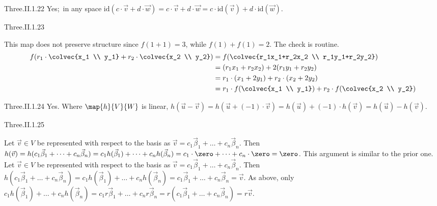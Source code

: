 \begin{ans}{Three.II.1.22}
      Yes;~in any space \( \text{id}(c\cdot \vec{v}+d\cdot \vec{w})
      = c\cdot \vec{v}+d\cdot \vec{w}
      = c\cdot\text{id}(\vec{v})+d\cdot\text{id}(\vec{w}) \).
    
\end{ans}
\begin{ans}{Three.II.1.23}
      \begin{exparts}
         \partsitem This map does not preserve structure since
           \( f(1+1)=3 \), while \( f(1)+f(1)=2 \).
         \partsitem The check is routine.
           \begin{align*}
             f(r_1\cdot\colvec{x_1 \\ y_1}+r_2\cdot\colvec{x_2 \\ y_2})
             &=f(\colvec{r_1x_1+r_2x_2 \\ r_1y_1+r_2y_2})               \\
             &=(r_1x_1+r_2x_2)+2(r_1y_1+r_2y_2)                          \\
             &=r_1\cdot (x_1+2y_1)+r_2\cdot (x_2+2y_2)                   \\
             &=r_1\cdot f(\colvec{x_1 \\ y_1})+r_2\cdot f(\colvec{x_2 \\ y_2})
           \end{align*}
      \end{exparts}
     
\end{ans}
\begin{ans}{Three.II.1.24}
      Yes.
      Where \( \map{h}{V}{W} \) is linear,
      \( h(\vec{u}-\vec{v})
         =h(\vec{u}+(-1)\cdot\vec{v})
         =h(\vec{u})+(-1)\cdot h(\vec{v})
         =h(\vec{u})-h(\vec{v}) \).
    
\end{ans}
\begin{ans}{Three.II.1.25}
      \begin{exparts}
       \partsitem Let \( \vec{v}\in V \) be represented with respect to the
         basis as \( \vec{v}=c_1\vec{\beta}_1+\dots+c_n\vec{\beta}_n \).
         Then \( h(\vec{v})=h(c_1\vec{\beta}_1+\dots+c_n\vec{\beta}_n)
                  =c_1h(\vec{\beta}_1)+\dots+c_nh(\vec{\beta}_n)
                  =c_1\cdot\zero+\dots+c_n\cdot\zero
                  =\zero \).
       \partsitem This argument is similar to the prior one.
         Let \( \vec{v}\in V \) be represented with respect to the
         basis as \( \vec{v}=c_1\vec{\beta}_1+\dots+c_n\vec{\beta}_n \).
         Then \( h(c_1\vec{\beta}_1+\dots+c_n\vec{\beta}_n)
            =c_1h(\vec{\beta}_1)+\dots+c_nh(\vec{\beta}_n)
            =c_1\vec{\beta}_1+\dots+c_n\vec{\beta}_n
            =\vec{v} \).
       \partsitem As above, only
         \( c_1h(\vec{\beta}_1)+\dots+c_nh(\vec{\beta}_n)
            =c_1r\vec{\beta}_1+\dots+c_nr\vec{\beta}_n
            =r(c_1\vec{\beta}_1+\dots+c_n\vec{\beta}_n)
            =r\vec{v} \).
      \end{exparts}
     
\end{ans}
